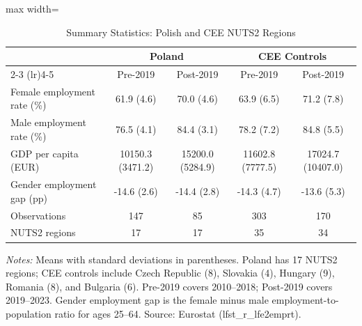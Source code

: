 \begin{table}[htbp]
\centering
\caption{Summary Statistics: Polish and CEE NUTS2 Regions}
\label{tab:summary}
\footnotesize
\begin{adjustbox}{max width=\textwidth}
\begin{tabular}{lcccc}
\toprule
 & \multicolumn{2}{c}{Poland} & \multicolumn{2}{c}{CEE Controls} \\
\cmidrule(lr){2-3} \cmidrule(lr){4-5}
 & Pre-2019 & Post-2019 & Pre-2019 & Post-2019 \\
\midrule
Female employment rate (\%) & 61.9 (4.6) & 70.0 (4.6) & 63.9 (6.5) & 71.2 (7.8) \\
Male employment rate (\%) & 76.5 (4.1) & 84.4 (3.1) & 78.2 (7.2) & 84.8 (5.5) \\
GDP per capita (EUR) & 10150.3 (3471.2) & 15200.0 (5284.9) & 11602.8 (7777.5) & 17024.7 (10407.0) \\
Gender employment gap (pp) & -14.6 (2.6) & -14.4 (2.8) & -14.3 (4.7) & -13.6 (5.3) \\
\midrule
Observations & 147 & 85 & 303 & 170 \\
NUTS2 regions & 17 & 17 & 35 & 34 \\
\bottomrule
\end{tabular}
\end{adjustbox}
\begin{tablenotes}[flushleft]
\small
\item \textit{Notes:} Means with standard deviations in parentheses. Poland has 17 NUTS2 regions; CEE controls include Czech Republic (8), Slovakia (4), Hungary (9), Romania (8), and Bulgaria (6). Pre-2019 covers 2010--2018; Post-2019 covers 2019--2023. Gender employment gap is the female minus male employment-to-population ratio for ages 25--64. Source: Eurostat (lfst\_r\_lfe2emprt).
\end{tablenotes}
\end{table}
